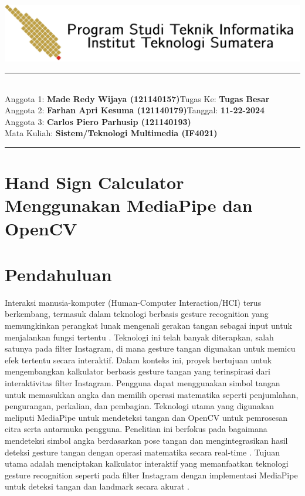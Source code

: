 \documentclass[11pt,a4paper]{article}
\newcommand{\studentA}{\textbf{Made Redy Wijaya (121140157)}}
\newcommand{\studentB}{\textbf{Farhan Apri Kesuma (121140179)}}
\newcommand{\studentC}{\textbf{Carlos Piero Parhusip (121140193)}}
\newcommand{\course}{\textbf{Sistem/Teknologi Multimedia (IF4021)}}
\newcommand{\assignment}{\textbf{Tugas Besar}}
\newcommand{\tanggal}{\textbf{11-22-2024}}
\begin{document}
\thispagestyle{empty}
\begin{center}
	\includegraphics[scale = 0.15]{Figure/ifitera-header.png}
	\vspace{0.1cm}
\end{center}
\noindent
\rule{17cm}{0.2cm}\\[0.3cm]
Anggota 1: \studentA \hfill Tugas Ke: \assignment\\[0.1cm]
Anggota 2: \studentB \hfill Tanggal: \tanggal\\[0.1cm]
Anggota 3: \studentC \\[0.1cm]
Mata Kuliah: \course \\[0.1cm]
\rule{17cm}{0.05cm}
\vspace{0.1cm}



\section*{Hand Sign Calculator Menggunakan MediaPipe dan OpenCV}


\section{Pendahuluan}
Interaksi manusia-komputer (Human-Computer Interaction/HCI) terus berkembang, termasuk dalam teknologi berbasis gesture recognition yang memungkinkan perangkat lunak mengenali gerakan tangan sebagai input untuk menjalankan fungsi tertentu \cite{10522212}. Teknologi ini telah banyak diterapkan, salah satunya pada filter Instagram, di mana gesture tangan digunakan untuk memicu efek tertentu secara interaktif. Dalam konteks ini, proyek bertujuan untuk mengembangkan kalkulator berbasis gesture tangan yang terinspirasi dari interaktivitas filter Instagram. Pengguna dapat menggunakan simbol tangan untuk memasukkan angka dan memilih operasi matematika seperti penjumlahan, pengurangan, perkalian, dan pembagian. Teknologi utama yang digunakan meliputi MediaPipe untuk mendeteksi tangan dan OpenCV untuk pemrosesan citra serta antarmuka pengguna. Penelitian ini berfokus pada bagaimana mendeteksi simbol angka berdasarkan pose tangan dan mengintegrasikan hasil deteksi gesture tangan dengan operasi matematika secara real-time \cite{10001800}. Tujuan utama adalah menciptakan kalkulator interaktif yang memanfaatkan teknologi gesture recognition seperti pada filter Instagram dengan implementasi MediaPipe untuk deteksi tangan dan landmark secara akurat \cite{10029038}.
    
\end{document}
